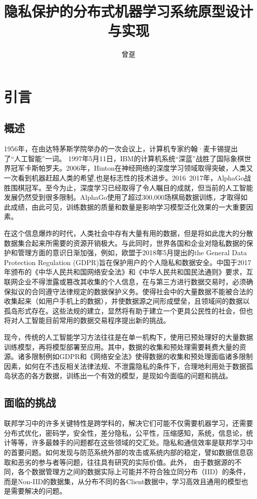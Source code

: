 \documentclass[zihao = -4,cn]{oucart}
\title{隐私保护的分布式机器学习系统原型设计与实现}
\author{曾趸}
\begin{document}
\makecover

\makesignature

\makeabstract

\thispagestyle{tableofcontents}  
\tableofcontents

\newpage
{}
\setcounter{page}{1} 
\section{引言}
\subsection{概述}
1956年，在由达特茅斯学院举办的一次会议上，计算机专家约翰·麦卡锡提出了“人工智能”一词。 1997年5月11日，IBM的计算机系统“深蓝”战胜了国际象棋世界冠军卡斯帕罗夫。2006年，Hinton在神经网络的深度学习领域取得突破\cite{hinton2006fast}，人类又一次看到机器赶超人类的希望,也是标志性的技术进步。2016~2017年，AlphaGo战胜围棋冠军。至今为止，深度学习已经取得了令人瞩目的成就，但当前的人工智能发展仍然受到很多限制。AlphaGo使用了超过300,000场棋局数据训练，才取得如此成绩，由此可见，训练数据的质量和数量是影响学习模型泛化效果的一大重要因素。\par
在这个信息爆炸的时代，人类社会中存有大量有用的数据，但是将如此庞大的分散数据集合起来所需要的资源开销极大。与此同时，世界各国和企业对隐私数据的保护和管理方面的意识日渐加强，例如，欧盟于2018年5月提出的the General Data Protection Regulation (GDPR)\cite{voigt2017eu}旨在保护用户的个人隐私和数据安全。中国于2017年颁布的《中华人民共和国网络安全法》和《中华人民共和国民法通则》要求，互联网企业不得泄露或篡改其收集的个人信息，在与第三方进行数据交易时，必须确保拟议的合同遵守法律规定的数据保护义务。使得社会中的大量数据不能被合法的收集起来（如用户手机上的数据），并使数据源之间形成壁垒，且领域间的数据以孤岛形式存在。这些法规的建立，显然将有助于建立一个更具公民性的社会，但也将对人工智能目前常用的数据交易程序提出新的挑战。\par
现今，传统的人工智能学习方法往往是在单一机构下，使用已预处理好的大量数据训练模型，再将模型部署至应用。其中，数据的收集和预处理需要耗费大量的资源。诸多限制例如GDPR和《网络安全法》使得数据的收集和预处理面临诸多限制因素，如何在不违反相关法律法规、不泄露隐私的条件下，合理地利用处于数据孤岛状态的各方数据，训练出一个有效的模型，是现如今面临的问题和挑战。

\subsection{面临的挑战}
联邦学习中的许多关键特性是跨学科的，解决它们可能不仅需要机器学习，还需要分布式优化，密码学，安全性，差分隐私，公平性，压缩感知，系统，信息论，统计等等，许多最棘手的问题都在这些领域的交汇处。隐私和通信效率是联邦学习中的首要问题。如何发现与防范系统外部的攻击或系统内部的稳定，譬如数据信息窃取和恶劣的参与者等问题，往往具有研究的实际价值。此外，
由于数据源的不同，各个数据管理方之间的数据实际上可能并不符合独立同分布（IID）的条件，而是Non-IID的数据集，从分布不同的各Client数据中，学习高效且通用的模型也是需要解决的问题。\par
\end{document}
